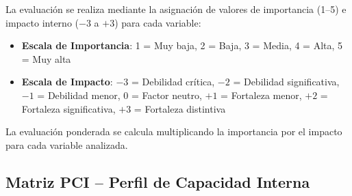 La evaluación se realiza mediante la asignación de valores de importancia (1--5) e impacto interno ($-3$ a $+3$) para cada variable:

\begin{itemize}
\item \textbf{Escala de Importancia}: 1 = Muy baja, 2 = Baja, 3 = Media, 4 = Alta, 5 = Muy alta
\item \textbf{Escala de Impacto}: $-3$ = Debilidad crítica, $-2$ = Debilidad significativa, $-1$ = Debilidad menor, 0 = Factor neutro, $+1$ = Fortaleza menor, $+2$ = Fortaleza significativa, $+3$ = Fortaleza distintiva
\end{itemize}

La evaluación ponderada se calcula multiplicando la importancia por el impacto para cada variable analizada.

\subsection{Matriz PCI -- Perfil de Capacidad Interna}

